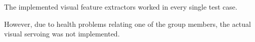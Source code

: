 
The implemented visual feature extractors worked in every single test case.

However, due to health problems relating one of the group members, the actual visual servoing was not implemented.
